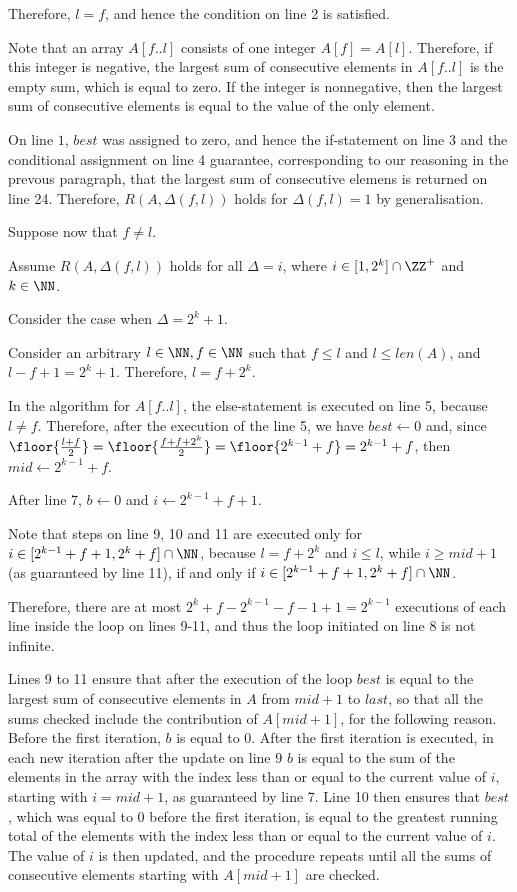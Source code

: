 \documentclass[11pt]{scrartcl}
\begin{document}
Therefore, $l = f$, and hence the condition on line 2 is satisfied.

Note that an array $A[f..l]$ consists of one integer $A[f] = A[l]$. Therefore, if this integer is negative, the largest sum of consecutive  elements in $A[f..l]$ is the empty sum, which is equal to zero. If the integer is nonnegative, then the largest sum of consecutive elements is equal to the value of the only element.

On line $1$, $best$ was assigned to zero, and hence the if-statement on line 3 and the conditional assignment on line 4 guarantee, corresponding to our reasoning in the prevous paragraph, that the largest sum of consecutive elemens is returned on line 24. Therefore, $R(A, \Delta(f, l))$ holds for $\Delta(f, l)=1$ by generalisation.

Suppose now that $f \neq l$.

Assume $R(A, \Delta(f, l))$ holds for all $\Delta = i$, where $i\in [1, 2^k] \cap \ZZ^+$ and $k\in\NN$.


Consider the case when $\Delta = 2^{k}+1$.

Consider an arbitrary $l\in\NN, f\in\NN$ such that $f \leq l$ and
$l\leq len(A)$, and $l-f+1 = 2^k+1$. Therefore, $l = f+2^k$.

In the algorithm for $A[f..l]$, the else-statement is executed on line 5, because $l\neq f$. Therefore, after the execution of the line 5, we have $best \gets 0$ and, since $\floor{\frac{l+f}{2}} = \floor{\frac{f+f+2^k}{2}} = \floor{2^{k-1}+f} = 2^{k-1}+f$, then $mid\gets 2^{k-1}+f$.

After line 7, $b \gets 0$ and $i\gets 2^{k-1}+f+1$.

Note that steps on line 9, 10 and 11 are executed only for
$i\in[2^{k-1}+f+1, 2^{k} +f]\cap\NN$, because $l = f+2^{k}$ and
$i\leq l$, while $i\geq mid+1$ (as guaranteed by line 11), if and only
if $i\in[2^{k-1}+f+1, 2^{k} +f]\cap\NN$.

Therefore, there are at most $2^k+f-2^{k-1}-f - 1 + 1 = 2^{k-1}$
executions of each line inside the loop on lines 9-11, and thus the
loop initiated on line 8 is not infinite.

Lines 9 to 11 ensure that after the execution of the loop $best$ is
equal to the largest sum of consecutive elements in $A$ from $mid+1$
to $last$, so that all the sums checked include the contribution of
$A[mid+1]$, for the following reason. Before the first iteration, $b$
is equal to 0. After the first iteration is executed, in each new
iteration after the update on line 9 $b$ is equal to the sum of the
elements in the array with the index less than or equal to the current
value of $i$, starting with $i= mid+1$, as guaranteed by line 7. Line
10 then ensures that $best$, which was equal to 0 before the first
iteration, is equal to the greatest running total of the elements with
the index less than or equal to the current value of $i$. The value of
$i$ is then updated, and the procedure repeats until all the sums of
consecutive elements starting with $A[mid+1]$ are checked.
\end{document}
